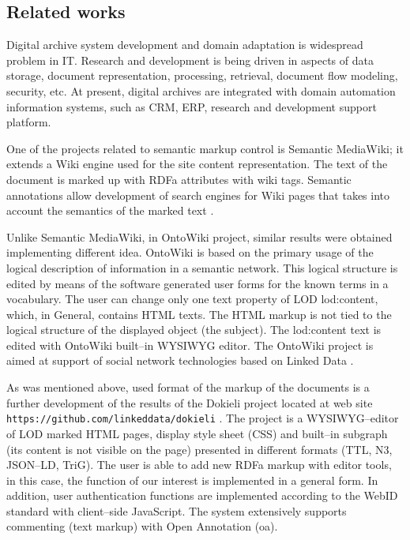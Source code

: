 \documentclass[conference,a4paper]{IEEEtran}
\providecommand\url[1]{\texttt{#1}}
\begin{document}
\subsection{Related works}
\label{sec:relwks}

Digital archive system development and domain adaptation is wide\-spre\-ad
problem in IT.  Research and development is being driven in aspects of
data storage, document representation, processing, retrieval, document
flow modeling, security, etc.  At present, digital archives are integrated
with domain automation information systems, such as CRM, ERP, research and
development support platform.

One of the projects related to semantic markup control is Semantic MediaWiki; it extends a Wiki engine used for the site content representation. The text of the document is marked up with RDFa attributes with wiki tags. Semantic annotations allow development of search engines for Wiki pages that takes into account the semantics of the marked text \cite{c6}.

Unlike Semantic MediaWiki, in OntoWiki project, similar results were obtained implementing different idea. OntoWiki is based on the primary usage of the logical description of information in a semantic network. This logical structure is edited by means of the software generated user forms for the known terms in a vocabulary. The user can change only one text property of LOD lod:content, which, in General, contains HTML texts. The HTML markup is not tied to the logical structure of the displayed object (the subject). The lod:content text is edited with OntoWiki built--in WYSIWYG editor. The OntoWiki project is aimed at support of social network technologies based on Linked Data \cite{b6}.

As was mentioned above, used format of the markup of the documents is a further development of the results of the Dokieli project located at web site \url{https://github.com/linkeddata/dokieli} \cite{b14}. The project is a WYSIWYG--editor of LOD marked HTML pages, display style sheet (CSS) and built--in subgraph (its content is not visible on the page) presented in different formats (TTL, N3, JSON--LD, TriG). The user is able to add new RDFa markup with editor tools, in this case, the function of our interest is implemented in a general form. In addition, user authentication functions are implemented according to the WebID standard with client--side JavaScript. The system extensively supports commenting (text markup) with Open Annotation (oa).
\end{document}
